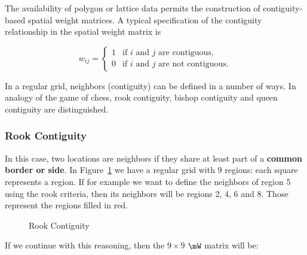 \documentclass[english,12pt]{book}\usepackage[]{graphicx}\usepackage[]{xcolor}
\begin{document}
The availability of polygon or lattice data permits the construction of contiguity-based spatial weight matrices. A typical specification of the contiguity relationship in the spatial weight matrix is

\begin{equation*}
  w_{ij}= 
   \begin{cases}
      1 & \mbox{if $i$ and $j$ are contiguous,} \\ 
      0 & \mbox{if $i$ and $j$ are not contiguous.} 
   \end{cases}
\end{equation*}

In a regular grid, neighbors (contiguity) can be defined in a number of ways. In analogy of the game of chess, rook contiguity, bishop contiguity and queen contiguity are distinguished.

\subsubsection{Rook Contiguity}

In this case, two locations are neighbors if they share at least part of a \textbf{common border or side}. In Figure~\ref{fig:Rook_cont_grid} we have a regular grid with 9 regions: each square represents a region. If for example we want to define the neighbors of region 5 using the rook criteria, then its neighbors will be regions 2, 4, 6 and 8. Those represent the regions filled in red. 

\begin{figure}[h]
\caption{Rook Contiguity}
\label{fig:Rook_cont_grid}
\centering
{}
\end{figure}

If we continue with this reasoning, then the $9\times 9$ $\mW$ matrix will be:
\end{document}
